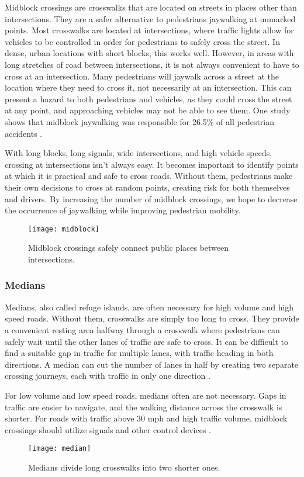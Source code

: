 Midblock crossings are crosswalks that are located on streets in places other than intersections.  They are a safer alternative to pedestrians jaywalking at unmarked points.  Most crosswalks are located at intersections, where traffic lights allow for vehicles to be controlled in order for pedestrians to safely cross the street.  In dense, urban locations with short blocks, this works well.  However, in areas with long stretches of road between intersections, it is not always convenient to have to cross at an intersection.  Many pedestrians will jaywalk across a street at the location where they need to cross it, not necessarily at an intersection.  This can present a hazard to both pedestrians and vehicles, as they could cross the street at any point, and approaching vehicles may not be able to see them.  One study shows that midblock jaywalking was responsible for 26.5\% of all pedestrian accidents \cite{mid1}.

With long blocks, long signals, wide intersections, and high vehicle speeds, crossing at intersections isn’t always easy.  It becomes important to identify points at which it is practical and safe to cross roads.  Without them, pedestrians make their own decisions to cross at random points, creating risk for both themselves and drivers.  By increasing the number of midblock crossings, we hope to decrease the occurrence of jaywalking while improving pedestrian mobility.

\begin{figure}[!htbp]
\centering
\texttt{[image: midblock]}
\caption[Midblock Crossing]{Midblock crossings safely connect public places between intersections.}\label{fig:midblock}
\end{figure}

\subsubsection{Medians}
Medians, also called refuge islands, are often necessary for high volume and high speed roads.  Without them, crosswalks are simply too long to cross.  They provide a convenient resting area halfway through a crosswalk where pedestrians can safely wait until the other lanes of traffic are safe to cross.  It can be difficult to find a suitable gap in traffic for multiple lanes, with traffic heading in both directions.  A median can cut the number of lanes in half by creating two separate crossing journeys, each with traffic in only one direction \cite{mid2}. 

For low volume and low speed roads, medians often are not necessary.  Gaps in traffic are easier to navigate, and the walking distance across the crosswalk is shorter.  For roads with traffic above 30 mph and high traffic volume, midblock crossings should utilize signals and other control devices \cite{mid2}.

\begin{figure}[!htbp]
\centering
\texttt{[image: median]}
\caption[Median]{Medians divide long crosswalks into two shorter ones.}\label{fig:median}
\end{figure}